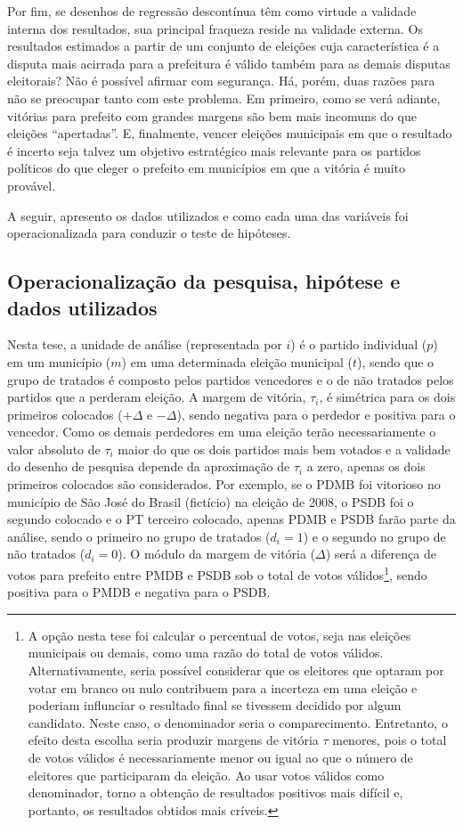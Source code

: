 Por fim, se desenhos de regressão descontínua têm como virtude a validade interna dos resultados, sua principal fraqueza reside na validade externa. Os resultados estimados a partir de um conjunto de eleições cuja característica é a disputa mais acirrada para a prefeitura é válido também para as demais disputas eleitorais? Não é possível afirmar com segurança. Há, porém, duas razões para não se preocupar tanto com este problema. Em primeiro, como se verá adiante, vitórias para prefeito com grandes margens são bem mais incomuns do que eleições ``apertadas''. E, finalmente, vencer eleições municipais em que o resultado é incerto seja talvez um objetivo estratégico mais relevante para os partidos políticos do que eleger o prefeito em municípios em que a vitória é muito provável.

A seguir, apresento os dados utilizados e como cada uma das variáveis foi operacionalizada para conduzir o teste de hipóteses.

\subsection{Operacionalização da pesquisa, hipótese e dados utilizados}

Nesta tese, a unidade de análise (representada por $i$) é o partido individual ($p$) em um município ($m$) em uma determinada eleição municipal ($t$), sendo que o grupo de tratados é composto pelos partidos vencedores e o de não tratados pelos partidos que a perderam eleição. A margem de vitória, $\tau_{i}$, é simétrica para os dois primeiros colocados ($+\Delta$ e $-\Delta$), sendo negativa para o perdedor e positiva para o vencedor. Como os demais perdedores em uma eleição terão necessariamente o valor absoluto de $\tau_{i}$ maior do que os dois partidos mais bem votados e a validade do desenho de pesquisa depende da aproximação de $\tau_{i}$ a zero, apenas os dois primeiros colocados são considerados. Por exemplo, se o PDMB foi vitorioso no município de São José do Brasil (fictício) na eleição de 2008, o PSDB foi o segundo colocado e o PT terceiro colocado, apenas PDMB e PSDB farão parte da análise, sendo o primeiro no grupo de tratados ($d_{i}=1$) e o segundo no grupo de não tratados ($d_{i}=0$). O módulo da margem de vitória ($\Delta$) será a diferença de votos para prefeito entre PMDB e PSDB sob o total de votos válidos\footnote{A opção nesta tese foi calcular o percentual de votos, seja nas eleições municipais ou demais, como uma razão do total de votos válidos. Alternativamente, seria possível considerar que os eleitores que optaram por votar em branco ou nulo contribuem para a incerteza em uma eleição e poderiam influnciar o resultado final se tivessem decidido por algum candidato. Neste caso, o denominador seria o comparecimento. Entretanto, o efeito desta escolha seria produzir margens de vitória $\tau$ menores, pois o total de votos válidos é necessariamente menor ou igual ao que o número de eleitores que participaram da eleição. Ao usar votos válidos como denominador, torno a obtenção de resultados positivos mais difícil e, portanto, os resultados obtidos mais críveis.}, sendo positiva para o PMDB e negativa para o PSDB.

